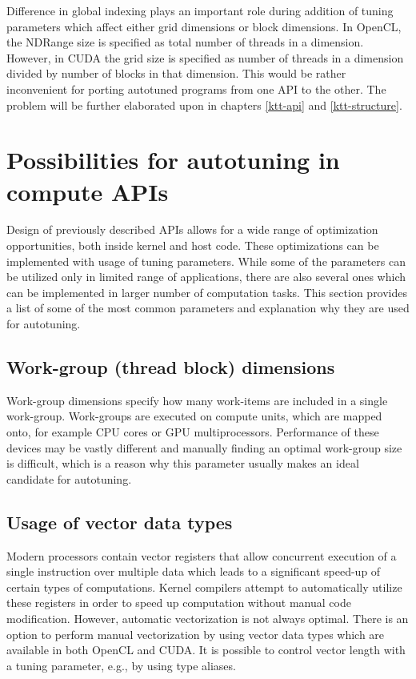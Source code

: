\documentclass
[
    digital, %
    oneside, %
    table, %
    nolof, %
    nolot, %
    nocover %
]{fithesis3}
\begin{document}
Difference in global indexing plays an important role during addition of tuning parameters which affect either grid dimensions or block dimensions.
In OpenCL, the NDRange size is specified as total number of threads in a dimension. However, in CUDA the grid size is specified as number of threads
in a dimension divided by number of blocks in that dimension. This would be rather inconvenient for porting autotuned programs from one API to the
other. The problem will be further elaborated upon in chapters \ref{ktt-api} and \ref{ktt-structure}.

\section{Possibilities for autotuning in compute APIs}
Design of previously described APIs allows for a wide range of optimization opportunities, both inside kernel and host code. These optimizations can
be implemented with usage of tuning parameters. While some of the parameters can be utilized only in limited range of applications, there are also
several ones which can be implemented in larger number of computation tasks. This section provides a list of some of the most common parameters and
explanation why they are used for autotuning.

\subsection{Work-group (thread block) dimensions}
Work-group dimensions specify how many work-items are included in a single work-group. Work-groups are executed on compute units, which are mapped
onto, for example CPU cores or GPU multiprocessors. Performance of these devices may be vastly different and manually finding an optimal work-group
size is difficult, which is a reason why this parameter usually makes an ideal candidate for autotuning.

\subsection{Usage of vector data types}
Modern processors contain vector registers that allow concurrent execution of a single instruction over multiple data which leads to a significant
speed-up of certain types of computations. Kernel compilers attempt to automatically utilize these registers in order to speed up computation without
manual code modification. However, automatic vectorization is not always optimal. There is an option to perform manual vectorization by using vector
data types which are available in both OpenCL and CUDA. It is possible to control vector length with a tuning parameter, e.g., by using type aliases.
\end{document}
